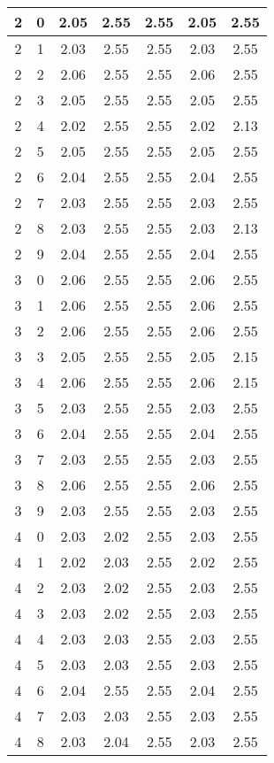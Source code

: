 \begin{longtable}{|c|c||c||c|c||c|c|}
	2 & 0 & 2.05 & 2.55 & 2.55 & 2.05 & 2.55 \\ \hline
	2 & 1 & 2.03 & 2.55 & 2.55 & 2.03 & 2.55 \\ \hline
	2 & 2 & 2.06 & 2.55 & 2.55 & 2.06 & 2.55 \\ \hline
	2 & 3 & 2.05 & 2.55 & 2.55 & 2.05 & 2.55 \\ \hline
	2 & 4 & 2.02 & 2.55 & 2.55 & 2.02 & 2.13 \\ \hline
	2 & 5 & 2.05 & 2.55 & 2.55 & 2.05 & 2.55 \\ \hline
	2 & 6 & 2.04 & 2.55 & 2.55 & 2.04 & 2.55 \\ \hline
	2 & 7 & 2.03 & 2.55 & 2.55 & 2.03 & 2.55 \\ \hline
	2 & 8 & 2.03 & 2.55 & 2.55 & 2.03 & 2.13 \\ \hline
	2 & 9 & 2.04 & 2.55 & 2.55 & 2.04 & 2.55 \\ \hline
	3 & 0 & 2.06 & 2.55 & 2.55 & 2.06 & 2.55 \\ \hline
	3 & 1 & 2.06 & 2.55 & 2.55 & 2.06 & 2.55 \\ \hline
	3 & 2 & 2.06 & 2.55 & 2.55 & 2.06 & 2.55 \\ \hline
	3 & 3 & 2.05 & 2.55 & 2.55 & 2.05 & 2.15 \\ \hline
	3 & 4 & 2.06 & 2.55 & 2.55 & 2.06 & 2.15 \\ \hline
	3 & 5 & 2.03 & 2.55 & 2.55 & 2.03 & 2.55 \\ \hline
	3 & 6 & 2.04 & 2.55 & 2.55 & 2.04 & 2.55 \\ \hline
	3 & 7 & 2.03 & 2.55 & 2.55 & 2.03 & 2.55 \\ \hline
	3 & 8 & 2.06 & 2.55 & 2.55 & 2.06 & 2.55 \\ \hline
	3 & 9 & 2.03 & 2.55 & 2.55 & 2.03 & 2.55 \\ \hline
	4 & 0 & 2.03 & 2.02 & 2.55 & 2.03 & 2.55 \\ \hline
	4 & 1 & 2.02 & 2.03 & 2.55 & 2.02 & 2.55 \\ \hline
	4 & 2 & 2.03 & 2.02 & 2.55 & 2.03 & 2.55 \\ \hline
	4 & 3 & 2.03 & 2.02 & 2.55 & 2.03 & 2.55 \\ \hline
	4 & 4 & 2.03 & 2.03 & 2.55 & 2.03 & 2.55 \\ \hline
	4 & 5 & 2.03 & 2.03 & 2.55 & 2.03 & 2.55 \\ \hline
	4 & 6 & 2.04 & 2.55 & 2.55 & 2.04 & 2.55 \\ \hline
	4 & 7 & 2.03 & 2.03 & 2.55 & 2.03 & 2.55 \\ \hline
	4 & 8 & 2.03 & 2.04 & 2.55 & 2.03 & 2.55 \\ \hline

\end{longtable}

